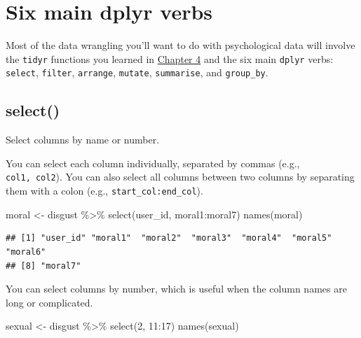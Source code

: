 \documentclass[
  oneside]{book}
\newenvironment{Shaded}{\begin{snugshade}}{\end{snugshade}}
\newcommand{\DecValTok}[1]{\textcolor[rgb]{0.00,0.00,0.81}{#1}}
\newcommand{\FunctionTok}[1]{\textcolor[rgb]{0.00,0.00,0.00}{#1}}
\newcommand{\NormalTok}[1]{#1}
\newcommand{\OtherTok}[1]{\textcolor[rgb]{0.56,0.35,0.01}{#1}}
\newcommand{\SpecialCharTok}[1]{\textcolor[rgb]{0.00,0.00,0.00}{#1}}
\begin{document}
\hypertarget{six-main-dplyr-verbs}{%
\section{Six main dplyr verbs}\label{six-main-dplyr-verbs}}

Most of the data wrangling you'll want to do with psychological data will involve the \texttt{tidyr} functions you learned in \protect\hyperlink{tidyr}{Chapter 4} and the six main \texttt{dplyr} verbs: \texttt{select}, \texttt{filter}, \texttt{arrange}, \texttt{mutate}, \texttt{summarise}, and \texttt{group\_by}.

\hypertarget{select}{%
\subsection{select()}\label{select}}

Select columns by name or number.

You can select each column individually, separated by commas (e.g., \texttt{col1,\ col2}). You can also select all columns between two columns by separating them with a colon (e.g., \texttt{start\_col:end\_col}).

\begin{Shaded}
\begin{Highlighting}[]
\NormalTok{moral }\OtherTok{\textless{}{-}}\NormalTok{ disgust }\SpecialCharTok{\%\textgreater{}\%} \FunctionTok{select}\NormalTok{(user\_id, moral1}\SpecialCharTok{:}\NormalTok{moral7)}
\FunctionTok{names}\NormalTok{(moral)}
\end{Highlighting}
\end{Shaded}

\begin{verbatim}
## [1] "user_id" "moral1"  "moral2"  "moral3"  "moral4"  "moral5"  "moral6" 
## [8] "moral7"
\end{verbatim}

You can select columns by number, which is useful when the column names are long or complicated.

\begin{Shaded}
\begin{Highlighting}[]
\NormalTok{sexual }\OtherTok{\textless{}{-}}\NormalTok{ disgust }\SpecialCharTok{\%\textgreater{}\%} \FunctionTok{select}\NormalTok{(}\DecValTok{2}\NormalTok{, }\DecValTok{11}\SpecialCharTok{:}\DecValTok{17}\NormalTok{)}
\FunctionTok{names}\NormalTok{(sexual)}
\end{Highlighting}
\end{Shaded}
\end{document}
